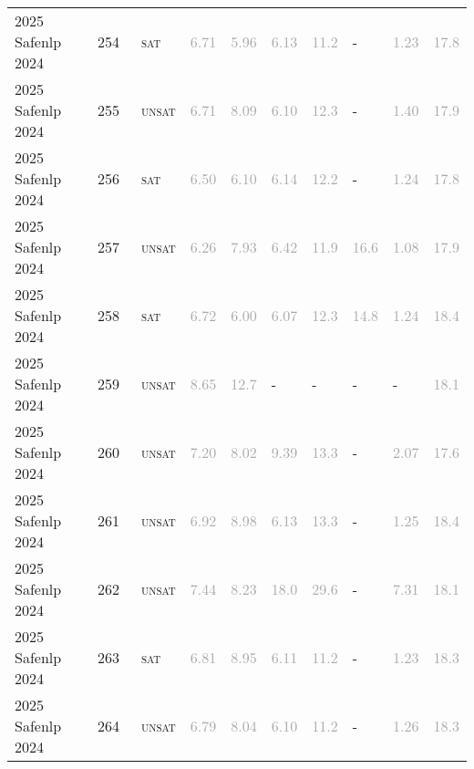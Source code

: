 \begin{center}
{\begin{longtable}{@{}llllllllll@{}}
2025 Safenlp 2024 & 254 & ~\textsc{sat} & \textcolor{darkgray}{6.71} & \textcolor{darkgray}{5.96} & \textcolor{darkgray}{6.13} & \textcolor{darkgray}{11.2} & - & \textcolor{darkgray}{1.23} & \textcolor{darkgray}{17.8} \\
2025 Safenlp 2024 & 255 & ~\textsc{unsat} & \textcolor{darkgray}{6.71} & \textcolor{darkgray}{8.09} & \textcolor{darkgray}{6.10} & \textcolor{darkgray}{12.3} & - & \textcolor{darkgray}{1.40} & \textcolor{darkgray}{17.9} \\
2025 Safenlp 2024 & 256 & ~\textsc{sat} & \textcolor{darkgray}{6.50} & \textcolor{darkgray}{6.10} & \textcolor{darkgray}{6.14} & \textcolor{darkgray}{12.2} & - & \textcolor{darkgray}{1.24} & \textcolor{darkgray}{17.8} \\
2025 Safenlp 2024 & 257 & ~\textsc{unsat} & \textcolor{darkgray}{6.26} & \textcolor{darkgray}{7.93} & \textcolor{darkgray}{6.42} & \textcolor{darkgray}{11.9} & \textcolor{darkgray}{16.6} & \textcolor{darkgray}{1.08} & \textcolor{darkgray}{17.9} \\
2025 Safenlp 2024 & 258 & ~\textsc{sat} & \textcolor{darkgray}{6.72} & \textcolor{darkgray}{6.00} & \textcolor{darkgray}{6.07} & \textcolor{darkgray}{12.3} & \textcolor{darkgray}{14.8} & \textcolor{darkgray}{1.24} & \textcolor{darkgray}{18.4} \\
2025 Safenlp 2024 & 259 & ~\textsc{unsat} & \textcolor{darkgray}{8.65} & \textcolor{darkgray}{12.7} & - & - & - & - & \textcolor{darkgray}{18.1} \\
2025 Safenlp 2024 & 260 & ~\textsc{unsat} & \textcolor{darkgray}{7.20} & \textcolor{darkgray}{8.02} & \textcolor{darkgray}{9.39} & \textcolor{darkgray}{13.3} & - & \textcolor{darkgray}{2.07} & \textcolor{darkgray}{17.6} \\
2025 Safenlp 2024 & 261 & ~\textsc{unsat} & \textcolor{darkgray}{6.92} & \textcolor{darkgray}{8.98} & \textcolor{darkgray}{6.13} & \textcolor{darkgray}{13.3} & - & \textcolor{darkgray}{1.25} & \textcolor{darkgray}{18.4} \\
2025 Safenlp 2024 & 262 & ~\textsc{unsat} & \textcolor{darkgray}{7.44} & \textcolor{darkgray}{8.23} & \textcolor{darkgray}{18.0} & \textcolor{darkgray}{29.6} & - & \textcolor{darkgray}{7.31} & \textcolor{darkgray}{18.1} \\
2025 Safenlp 2024 & 263 & ~\textsc{sat} & \textcolor{darkgray}{6.81} & \textcolor{darkgray}{8.95} & \textcolor{darkgray}{6.11} & \textcolor{darkgray}{11.2} & - & \textcolor{darkgray}{1.23} & \textcolor{darkgray}{18.3} \\
2025 Safenlp 2024 & 264 & ~\textsc{unsat} & \textcolor{darkgray}{6.79} & \textcolor{darkgray}{8.04} & \textcolor{darkgray}{6.10} & \textcolor{darkgray}{11.2} & - & \textcolor{darkgray}{1.26} & \textcolor{darkgray}{18.3} \\

\end{longtable}}
\end{center}
